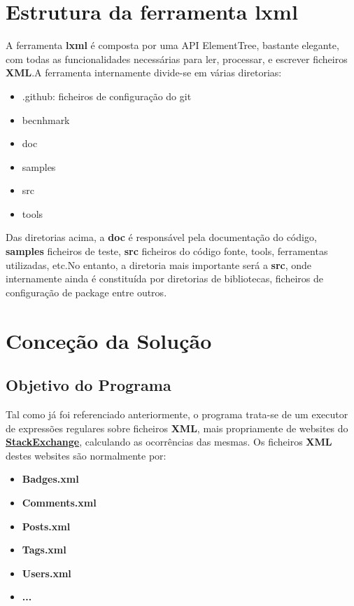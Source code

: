 \documentclass[11pt,a4paper]{report}%
\begin{document}
\chapter{Estrutura da ferramenta lxml}
A ferramenta \textbf{lxml} é composta por uma API ElementTree, bastante elegante, com todas as funcionalidades necessárias para ler, processar, e escrever ficheiros \textbf{XML}.\newline A ferramenta internamente divide-se em várias diretorias:
\begin{itemize}
    \item .github: ficheiros de configuração do git
    \item becnhmark
    \item doc
    \item samples
    \item src
    \item tools
\end{itemize}{}

Das diretorias acima, a \textbf{doc} é responsável pela documentação do código, \textbf{samples} ficheiros de teste, \textbf{src} ficheiros do código fonte, tools, ferramentas utilizadas, etc.\newline No entanto, a diretoria mais importante será a \textbf{src}, onde internamente ainda é constituída por diretorias de bibliotecas, ficheiros de configuração de package entre outros.

\chapter{Conceção da Solução}

\section{Objetivo do Programa}
Tal como já foi referenciado anteriormente, o programa trata-se de um executor de expressões regulares sobre ficheiros \textbf{XML}, mais propriamente de websites do \textbf{\href{https://archive.org/download/stackexchange}{StackExchange}}, calculando as ocorrências das mesmas. Os ficheiros \textbf{XML} destes websites são normalmente por:

\begin{itemize}
    \item \textbf{Badges.xml}
    \item \textbf{Comments.xml}
    \item \textbf{Posts.xml}
    \item \textbf{Tags.xml}
    \item \textbf{Users.xml}
    \item \textbf{...}
\end{itemize}{}
\end{document}
